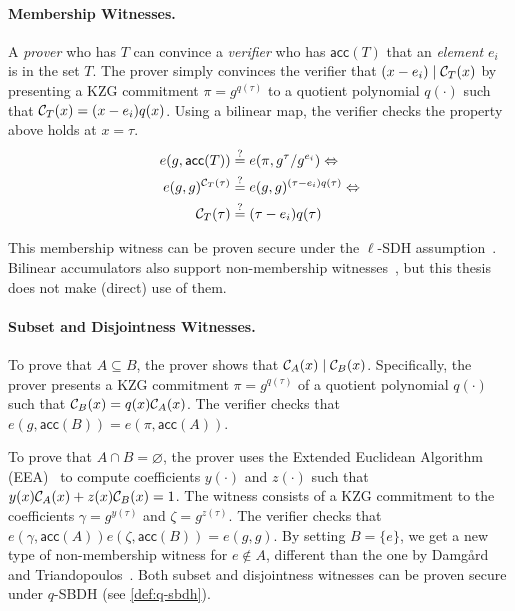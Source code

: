 \paragraph{Membership Witnesses.}
A \textit{prover} who has $T$ can convince a \textit{verifier} who has $\mathsf{acc}(T)$ that an \textit{element} $e_i$ is in the set $T$.
The prover simply convinces the verifier that $(x-e_i) \mathrel| \mathcal{C}_T(x)$ by presenting a KZG commitment $\pi=g^{q(\tau)}$ to a quotient polynomial $q(\cdot)$ such that $\mathcal{C}_T(x) = (x-e_i)q(x)$.
Using a bilinear map, the verifier checks the property above holds at $x=\tau$.
\begin{align*}
e(g, \mathsf{acc}(T)) &\stackrel{?}{=} e(\pi, g^\tau / g^{e_i}) \Leftrightarrow\\
e(g, g)^{\mathcal{C}_T(\tau)} &\stackrel{?}{=} e(g,g)^{(\tau-e_i)q(\tau)}\Leftrightarrow\\
\mathcal{C}_T(\tau) &\stackrel{?}{=} (\tau-e_i)q(\tau)
\end{align*}

This membership witness can be proven secure under the $\ell$-SDH assumption~\cite{KZG10a}.
Bilinear accumulators also support non-membership witnesses~\cite{DT08}, but this thesis does not make (direct) use of them.

\paragraph{Subset and Disjointness Witnesses.}
To prove that $A\subseteq B$, the prover shows that $\mathcal{C}_A(x) \mathrel| \mathcal{C}_{B}(x)$.
Specifically, the prover presents a KZG commitment $\pi=g^{q(\tau)}$ of a quotient polynomial $q(\cdot)$ such that $\mathcal{C}_B(x) = q(x)\mathcal{C}_A(x)$.
The verifier checks that $e(g, \mathsf{acc}(B)) = e(\pi, \mathsf{acc}(A))$.

To prove that $A\cap B = \varnothing$, the prover uses the Extended Euclidean Algorithm (EEA)~\cite{vG13ModernCh11} to compute \bezout coefficients $y(\cdot)$ and $z(\cdot)$ such that $y(x)\mathcal{C}_A(x) + z(x)\mathcal{C}_B(x) = 1$.
The witness consists of a KZG commitment to the \bezout coefficients $\gamma = g^{y(\tau)}$ and $\zeta = g^{z(\tau)}$.
The verifier checks that $e(\gamma,\mathsf{acc}(A))e(\zeta, \mathsf{acc}(B)) = e(g,g)$.
By setting $B=\{e\}$, we get a new type of non-membership witness for $e\notin A$, different than the one by Damg{\aa}rd and Triandopoulos~\cite{DT08}.
Both subset and disjointness witnesses can be proven secure under $q$-SBDH (see \cref{def:q-sbdh}).